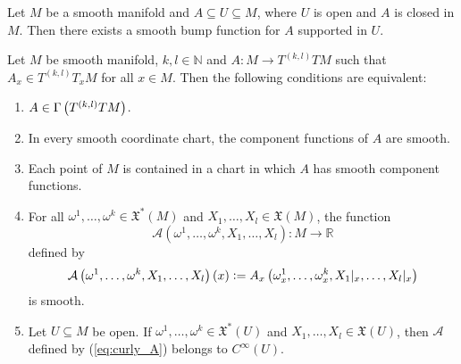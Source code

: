 \begin{proposition}
	\label{prop:existence_smooth_bump_functions}
	Let $M$ be a smooth manifold and $A \subseteq U \subseteq M$, where $U$ is open and $A$ is closed in $M$. Then there exists a smooth bump function for $A$ supported in $U$. 	
\end{proposition}

\begin{proposition}
	\label{prop:smoothness_criteria_for_tensor_fields}
	Let $M$ be smooth manifold, $k,l \in \mathbb{N}$ and $A : M \to T^{(k,l)}TM$ such that $A_x \in T^{(k,l)}T_xM$ for all $x \in M$. Then the following conditions are equivalent:
	\begin{enumerate}[label = \textup{(\alph*\textup)},leftmargin=*]
		\item $A \in \Gamma\del[1]{T^{(k,l)}TM}$.
		\item In every smooth coordinate chart, the component functions of $A$ are smooth.
		\item Each point of $M$ is contained in a chart in which $A$ has smooth component functions.
		\item For all $\omega^1,\dots,\omega^k \in \mathfrak{X}^*(M)$ and $X_1,\dots,X_l \in \mathfrak{X}(M)$, the function 
			\begin{equation*}
				\mathcal{A}(\omega^1,\dots,\omega^k,X_1,\dots,X_l) : M \to \mathbb{R}
			\end{equation*}
			\noindent defined by
			\begin{equation}
				\label{eq:curly_A}
				\mathcal{A}\del[1]{\omega^1,\dots,\omega^k,X_1,\dots,X_l}(x) := A_x\del[1]{\omega^1_x,\dots,\omega^k_x, X_1\vert_x,\dots,X_l\vert_x}
			\end{equation}
			\noindent is smooth.
		\item Let $U \subseteq M$ be open. If $\omega^1,\dots,\omega^k \in \mathfrak{X}^*(U)$ and $X_1,\dots,X_l \in \mathfrak{X}(U)$, then $\mathcal{A}$ defined by \textup{(\ref{eq:curly_A})} belongs to $C^\infty(U)$.
	\end{enumerate}
\end{proposition}

